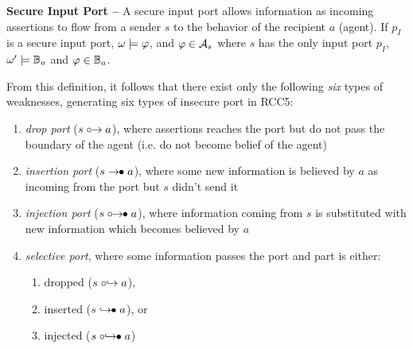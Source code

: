 \begin{definition}{\bf Secure Input Port --}\label{def:secport}
	A secure input port allows information as incoming assertions to flow
	from a sender $s$ to the behavior of the recipient $a$ (agent).  If $p_I$ is a secure input port,
	$\omega\models\varphi$, and $\varphi\in\mathcal{A}_s$ where $s$
	has the only input port $p_I$, $\omega'\models\mathbb{B}_a$ and $\varphi\in\mathbb{B}_a$.
\end{definition}

From this definition, it follows that there exist only the following \emph{six} types of weaknesses, generating six types of insecure port in RCC5:
\begin{enumerate}[start=1, label={W\arabic*)}]
	\item \emph{drop port} ($s\mathrel{\circ\!\!\rightarrow} a$), where assertions reaches the port but do not pass the boundary of the agent (i.e. do not become belief of the agent)
	\item \emph{insertion port} ($s\mathrel{\rightarrow\!\!\bullet} a$), where some new information is believed by $a$ as incoming from the port but $s$ didn't send it
	\item \emph{injection port} ($s\mathrel{\circ\!\!\rightarrow\!\!\bullet} a$), where information coming from $s$ is substituted with new information which becomes believed by $a$
	\item \emph{selective port}, where some information passes the port and part is either:
	\begin{enumerate}[start=1, label={W4.\arabic*)}]
		\item dropped ($s\mathrel{\circ\!\!\hookrightarrow} a$), 
		\item inserted ($s\mathrel{\hookrightarrow\!\!\bullet} a$), or
		\item injected ($s\mathrel{\circ\!\!\hookrightarrow\!\!\bullet} a$)
\end{enumerate}
\end{enumerate}

